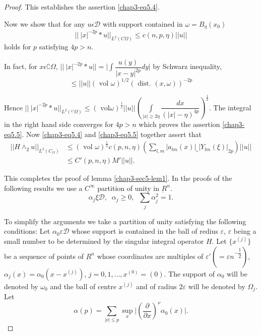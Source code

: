 \begin{proof}
This establishes the assertion \eqref{chap3-eq5.4}.

Now we show that for any $u \epsilon \mathscr{D}$ with support
contained in $\omega = B_\eta (x_0) $ 
\begin{equation}
||~ |x|^{-2p}* u ||_{L^2(C \Omega)} \leq c (n, p, \eta)|| u ||
\tag{5.5}  \label{chap3-eq5.5}
\end{equation}
holds for $p$ satisfying $4 p > n$. 

In fact, 
for $x \epsilon \complement \Omega$, $|| ~|x|^{-2p} * u || = \big|\int
\dfrac{{u(y)}}{|x-y|^{2p}}dy\big|$ 
by Schwarz inequality, 
$$
\leq || u || (\text{ vol } \omega)^{1/2}(\text{ dist. }
(x,\omega))^{-2p}   
$$

Hence 
$ ||~|x|^{-2p} * u ||_{L^2({}^C\Omega)} \leq (\text{ vol}
\omega)^{\frac{1}{2}}||u|| ( \int\limits_{|x| \ge 2 \eta}
\dfrac{dx}{(|x| - \eta )^{4p}})^{\frac{1}{2}}$.  
The integral in the right hand side converges for $4p >n$ which 
proves the assertion \eqref{chap3-eq5.5}. Now \eqref{chap3-eq5.4} and
\eqref{chap3-eq5.5} together assert that  
\begin{align*}
||H \wedge_2 u || _{L^2(C_\Omega)} & \leq (\text{ vol } 
\omega)^\frac{1}{2} c (p,n,\eta) \left(\sum\limits_{l,m}| a_{lm}(x)|_\circ |
Y_{lm} (\xi) |_{2p} \right)|| u ||\\
&  \leq C' (p,n,\eta) M' || u ||.    
\end{align*}

This completes the proof of lemma \ref{chap3-sec5-lem1}. In the proofs
of the following 
results we use a $C^\infty$ partition of unity in $ \underbar{R}^n$. 
$$
\alpha_j \xi \mathscr{D},\;\;  \alpha_j \geq 0, \;\;
\sum\limits_{j}\alpha^2_j = 1. 
$$\pageoriginale

To simplify the arguments we take a partition of unity satisfying the
following conditions: Let $\alpha_0 \varepsilon \mathscr{D}$ whose
support is contained in the ball of redius $\varepsilon$,
$\varepsilon$ being a small number to be determined by the singular
integral operator $H$. Let $\{x^{(j)}\}$ be a sequence of points of
$\underbar{R}^n $ whose coordinates are multiples of $\varepsilon'(=
\varepsilon n^{- \dfrac{1}{2}})$, $\alpha_j(x) = \alpha_0 (x-x^{(j)}
)$, $j = 0, 1,\ldots, x^{(0)} =  (0)$. The support of $\alpha_0$
will be denoted by $\omega_0$ and the ball of centre $x^{(j)} $ and of
radius $2 \varepsilon$ will be denoted by $\Omega_j$. Let  
$$
\alpha(p) = \sum \limits_{|\nu|\leq p } \sup\limits_{x}
\big|\left(\frac{\partial}{\partial x}\right)^\nu \alpha_0 (x) \big|.  
$$
\end{proof}

